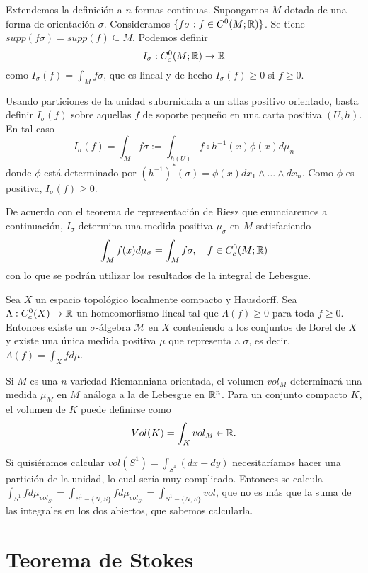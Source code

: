 \documentclass[CV.tex]{subfiles}
\begin{document}
\begin{nota}
Extendemos la definición a $n$-formas continuas. Supongamos $M$ dotada de una forma de orientación $\sigma$. Consideramos $\{f\sigma:f\in C^0(M;\mathbb{R})\}$. Se tiene $supp(f\sigma)=supp(f)\subseteq M$. Podemos definir 
\[
I_\sigma:C_c^0(M;\mathbb{R})\to\mathbb{R}
\]
como $I_\sigma(f)=\int_M f\sigma$, que es lineal y de hecho $I_\sigma(f)\geq 0$ si $f\geq 0$. 

Usando particiones de la unidad subornidada a un atlas positivo orientado, basta definir $I_\sigma(f)$ sobre aquellas $f$ de soporte pequeño en una carta positiva $(U,h)$. En tal caso
\[
I_\sigma(f)=\int_M f\sigma:=\int_{h(U)}f\circ h^{-1}(x)\phi(x) d\mu_n
\]
donde $\phi$ está determinado por $(h^{-1})^*(\sigma)=\phi(x)dx_1\land\dots\land dx_n$. Como $\phi$ es positiva, $I_\sigma(f)\geq 0$.

De acuerdo con el teorema de representación de Riesz que enunciaremos a continuación, $I_\sigma$ determina una medida positiva $\mu_\sigma$ en $M$ satisfaciendo
\[
\int_M f(x)d\mu_\sigma=\int_M f\sigma, \quad f\in C_c^0(M;\mathbb{R})
\]
con lo que se podrán utilizar los resultados de la integral de Lebesgue. 

\begin{teorema}
Sea $X$ un espacio topológico localmente compacto y Hausdorff. Sea $\Lambda:C_c^0(X)\to\mathbb{R}$ un homeomorfismo lineal tal que $\Lambda(f)\geq 0$ para toda $f\geq 0$. Entonces existe un $\sigma$-álgebra $\mathcal{M}$ en $X$ conteniendo a los conjuntos de Borel de $X$ y existe una única medida positiva $\mu$ que representa a $\sigma$, es decir, $\Lambda(f)=\int_X f d\mu$.
\end{teorema}

Si $M$ es una $n$-variedad Riemanniana orientada, el volumen $vol_M$ determinará una medida $\mu_M$ en $M$ análoga a la de Lebesgue en $\mathbb{R}^n$. Para un conjunto compacto $K$, el volumen de $K$ puede definirse como 
\[
Vol(K)=\int_K vol_M\in\mathbb{R}.
\]
\end{nota}

\begin{ej}
Si quisiéramos calcular $vol(S^1)=\int_{S^1} (dx- dy)$ necesitaríamos hacer una partición de la unidad, lo cual sería muy complicado. Entonces se calcula $\int_{S^1} f d\mu_{vol_{S^1}}=\int_{S^1-\{N,S\}} f d\mu_{vol_{S^1}}=\int_{S^1-\{N,S\}} vol$, que no es más que la suma de las integrales en los dos abiertos, que sabemos calcularla.
\end{ej}

\section{Teorema de Stokes}
\end{document}

